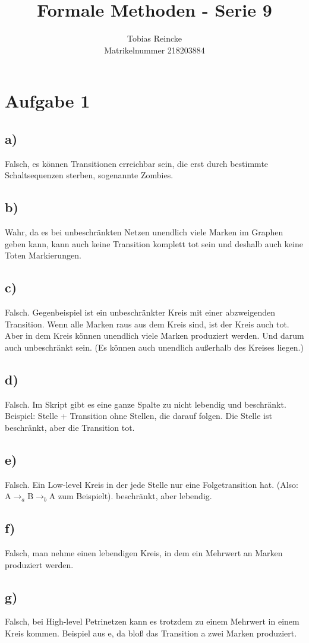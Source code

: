 \documentclass[]{article}
\title{Formale Methoden - Serie 9}
\author{Tobias Reincke \\ Matrikelnummer 218203884}
\date{}
\begin{document}
	\maketitle

\section*{Aufgabe 1}
\subsection*{a)} Falsch, es können Transitionen erreichbar sein, die erst durch bestimmte Schaltsequenzen sterben, sogenannte Zombies.
\subsection*{b)} Wahr, da es bei unbeschränkten Netzen unendlich viele Marken im Graphen geben kann, kann auch keine Transition komplett tot sein und deshalb auch keine Toten Markierungen.
\subsection*{c)} Falsch.  Gegenbeispiel ist ein unbeschränkter Kreis mit einer abzweigenden Transition. Wenn alle Marken raus aus dem Kreis sind, ist der Kreis auch tot. Aber in dem Kreis können unendlich viele Marken produziert werden. Und darum auch unbeschränkt sein. (Es können auch unendlich außerhalb des Kreises liegen.)
\subsection*{d)} Falsch.  Im Skript gibt es eine ganze Spalte zu nicht lebendig und beschränkt. Beispiel: Stelle + Transition ohne Stellen, die darauf folgen. Die Stelle ist beschränkt, aber die Transition tot. 
\subsection*{e)} Falsch. Ein Low-level Kreis in der jede Stelle nur eine Folgetransition hat. (Also: A$\rightarrow_a$B$\rightarrow_b$A zum Beispielt). beschränkt, aber lebendig. 
\subsection*{f)} Falsch, man nehme einen lebendigen Kreis, in dem ein Mehrwert an  Marken produziert werden. 
\subsection*{g)} Falsch, bei High-level Petrinetzen kann es trotzdem zu einem Mehrwert in einem Kreis kommen. Beispiel aus e, da bloß das Transition a zwei Marken  produziert.
\newpage
\end{document}
